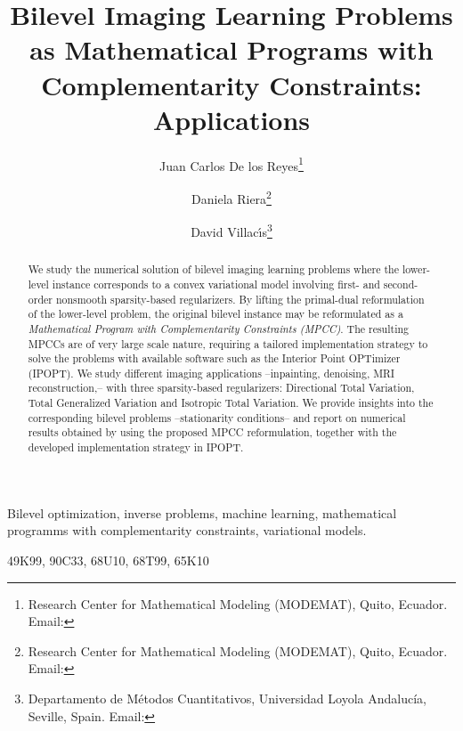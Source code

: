 \documentclass[review,onefignum,onetabnum]{siamonline190516}
\title{Bilevel Imaging Learning Problems as Mathematical Programs with\\ Complementarity Constraints: Applications
}
\author{Juan Carlos De los Reyes\thanks{Research Center for Mathematical Modeling (MODEMAT), Quito, Ecuador.
  Email: \email{juan.delosreyes@epn.edu.ec}}\and Daniela Riera\thanks{Research Center for Mathematical Modeling (MODEMAT), Quito, Ecuador. Email: \email{daniela.riera@epn.edu.ec}} \and David Villac\'{\i}s\thanks{Departamento de M\'etodos Cuantitativos, Universidad Loyola Andaluc\'ia, Seville, Spain. Email: \email{davillacis@uloyola.es}}
}
\begin{document}
\maketitle

\begin{abstract}
    We study the numerical solution of bilevel imaging learning problems where the lower-level instance corresponds to a convex variational model involving first- and second-order nonsmooth sparsity-based regularizers. By lifting the primal-dual reformulation of the lower-level problem, the original bilevel instance may be reformulated as a \emph{Mathematical Program with Complementarity Constraints (MPCC)}. The resulting MPCCs are of very large scale nature, requiring a tailored implementation strategy to solve the problems with available software such as the Interior Point OPTimizer (IPOPT). We study different imaging applications --inpainting, denoising, MRI reconstruction,-- with three sparsity-based regularizers: Directional Total Variation, Total Generalized Variation and Isotropic Total Variation. We provide insights into the corresponding bilevel problems --stationarity conditions-- and report on numerical results obtained by using the proposed MPCC reformulation, together with the developed implementation strategy in IPOPT.
  \end{abstract}

\begin{keywords}
  Bilevel optimization, inverse problems, machine learning, mathematical programms with complementarity constraints, variational models.
\end{keywords}

\begin{AMS}
  49K99, 90C33, 68U10, 68T99, 65K10
\end{AMS}


\end{document}

